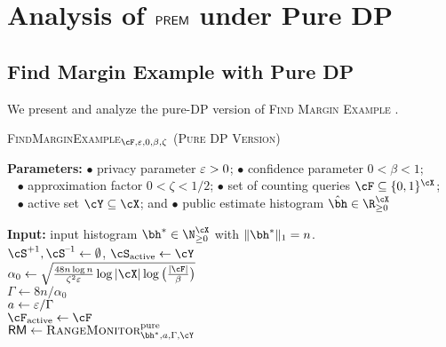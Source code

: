 \section{\boldmath Analysis of $\mathsf{PREM}$ under Pure DP}
\label{sec:PREM_pure_DP}

\subsection{Find Margin Example with Pure DP}

We present and analyze the pure-DP version of \textsc{Find Margin Example} .

\begin{algorithm}[t]
    \caption{\textsc{FindMarginExample}$_{\cF,\eps,0,\beta,\zeta}$ (\textsc{Pure DP Version})}
    \label{alg:find-example-pure-DP}
    \begin{algorithmic}
        \item[\textbf{Parameters:}] 
        {\footnotesize $\bullet$ } privacy parameter $\varepsilon > 0$; 
            \qquad\qquad\qquad\quad
            {\footnotesize $\bullet$ } confidence parameter $0 < \beta < 1$;\\
            \qquad\qquad\,\,\, {\footnotesize $\bullet$ } approximation factor $0 < \zeta < 1 / 2$;
            \quad \quad \quad
            {\footnotesize $\bullet$ } set of counting queries $\cF\subseteq \{0, 1\}^{\cX}$;\\
            \qquad\qquad\,\,\,
            {\footnotesize $\bullet$ } active set $\cY\subseteq \cX$; and
            \qquad \qquad\qquad\qquad
            {\footnotesize $\bullet$ }public estimate histogram $\hbh\in \R_{\geq 0}^{\cX}$
        \item[\textbf{Input:}] input histogram $\bh^{\ast} \in \N_{\geq 0}^{\cX}$ with $\|\bh^{\ast}\|_1=n$.\\
        $\cS^{\plus}, \cS^{\minus} \gets \emptyset$, $\cS_{\acti} \gets \cY$ \;\\
        $\alpha_0\gets \sqrt{\frac{48 n\log n}{\zeta^2\eps}\log|\cX|\log\big(\frac{|\cF|}{\beta}\big)}$\; \\
        $\Gamma\gets 8n/\alpha_0$\;\\
        $a\gets\varepsilon/\Gamma$\; \\
        $\cF_{\acti}\gets \cF$\; \\ %
        $\OIM\gets\OutsideIntervalMonitor^{\mathrm{pure}}_{\bh^{\ast},a,\Gamma,\cY}$ \hfill {}\\
\end{algorithmic}
\end{algorithm}
